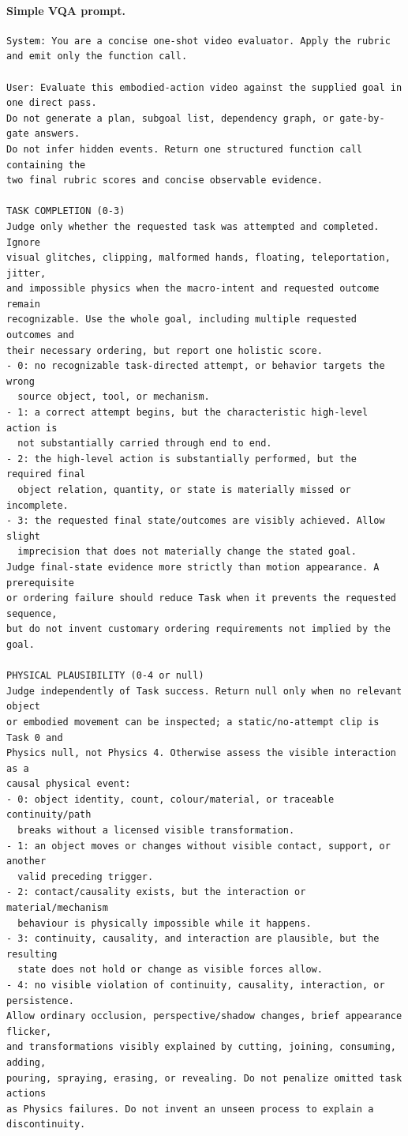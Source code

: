 \paragraph{Simple VQA prompt.}
\begin{lstlisting}[style=promptstyle]
System: You are a concise one-shot video evaluator. Apply the rubric and emit only the function call.

User: Evaluate this embodied-action video against the supplied goal in one direct pass.
Do not generate a plan, subgoal list, dependency graph, or gate-by-gate answers.
Do not infer hidden events. Return one structured function call containing the
two final rubric scores and concise observable evidence.

TASK COMPLETION (0-3)
Judge only whether the requested task was attempted and completed. Ignore
visual glitches, clipping, malformed hands, floating, teleportation, jitter,
and impossible physics when the macro-intent and requested outcome remain
recognizable. Use the whole goal, including multiple requested outcomes and
their necessary ordering, but report one holistic score.
- 0: no recognizable task-directed attempt, or behavior targets the wrong
  source object, tool, or mechanism.
- 1: a correct attempt begins, but the characteristic high-level action is
  not substantially carried through end to end.
- 2: the high-level action is substantially performed, but the required final
  object relation, quantity, or state is materially missed or incomplete.
- 3: the requested final state/outcomes are visibly achieved. Allow slight
  imprecision that does not materially change the stated goal.
Judge final-state evidence more strictly than motion appearance. A prerequisite
or ordering failure should reduce Task when it prevents the requested sequence,
but do not invent customary ordering requirements not implied by the goal.

PHYSICAL PLAUSIBILITY (0-4 or null)
Judge independently of Task success. Return null only when no relevant object
or embodied movement can be inspected; a static/no-attempt clip is Task 0 and
Physics null, not Physics 4. Otherwise assess the visible interaction as a
causal physical event:
- 0: object identity, count, colour/material, or traceable continuity/path
  breaks without a licensed visible transformation.
- 1: an object moves or changes without visible contact, support, or another
  valid preceding trigger.
- 2: contact/causality exists, but the interaction or material/mechanism
  behaviour is physically impossible while it happens.
- 3: continuity, causality, and interaction are plausible, but the resulting
  state does not hold or change as visible forces allow.
- 4: no visible violation of continuity, causality, interaction, or persistence.
Allow ordinary occlusion, perspective/shadow changes, brief appearance flicker,
and transformations visibly explained by cutting, joining, consuming, adding,
pouring, spraying, erasing, or revealing. Do not penalize omitted task actions
as Physics failures. Do not invent an unseen process to explain a discontinuity.


\end{lstlisting}
